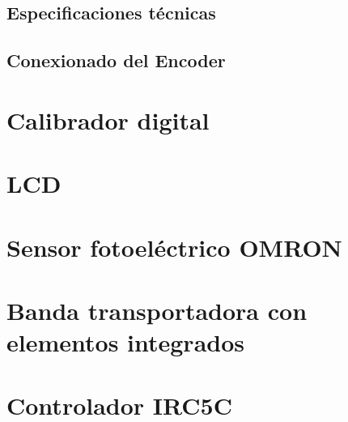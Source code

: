 \subsection{Especificaciones técnicas}

\subsection{Conexionado del Encoder}

\section{Calibrador digital}

\section{LCD}

\section{Sensor fotoeléctrico OMRON}

\section{Banda transportadora con elementos integrados}

\section{Controlador IRC5C}